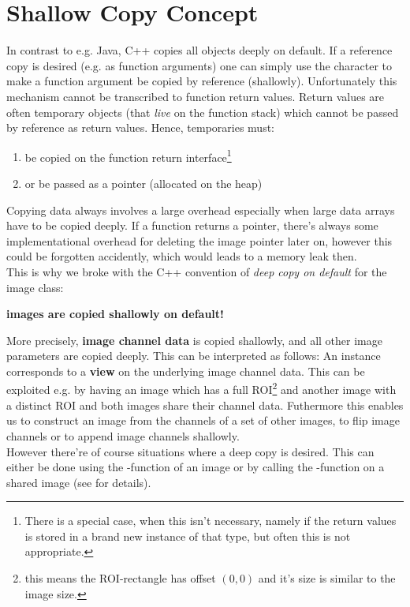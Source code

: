 \section {Shallow Copy Concept}

In contrast to e.g. Java, C++ copies all objects deeply on default. If a reference copy is desired (e.g. as function arguments) one can simply use the \inlinecode{&} character to make a function argument be copied by reference (shallowly). Unfortunately this mechanism cannot be transcribed to function return values. Return values are often temporary objects (that \emph{live} on the function stack) which cannot be passed by reference as return values. Hence, temporaries must:
\begin{enumerate}
\item be copied on the function return interface\footnote{There is a special case, when this isn't necessary, namely if the return values is stored in a brand new instance of that type, but often this is not appropriate.}
\item or be passed as a pointer (allocated on the heap)
\end{enumerate}
Copying data always involves a large overhead especially when large data arrays have to be copied deeply. If a function returns a pointer, there's always some implementational overhead for deleting the image pointer later on, however this could be forgotten accidently, which would leads to a memory leak then.\\
This is why we broke with the C++ convention of \emph{deep copy on default} for the image class:
\begin{center}
\textbf{images are copied shallowly on default!}\\[20pt]
\end{center}
More precisely, \textbf{image channel data} is copied shallowly, and all other image parameters are copied deeply. This can be interpreted as follows:
An  instance corresponds to a \textbf{view} on the underlying image channel data. This can be exploited e.g. by having an image  which has a full ROI\footnote{this means the ROI-rectangle has offset $(0,0)$ and it's size is similar to the image size.} and another image  with a distinct ROI and both images share their channel data. Futhermore this enables us to  construct an image from the channels of a set of other images, to flip image channels or to append image channels shallowly.\\
However there're of course situations where a deep copy is desired. This can either be done using the -function of an image or by calling the -function on a shared image (see  for details).

